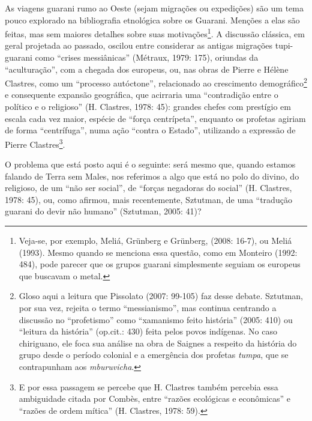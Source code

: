 As viagens guarani rumo ao Oeste (sejam migrações ou expedições) são um
tema pouco explorado na bibliografia etnológica sobre os Guarani.
Menções a elas são feitas, mas sem maiores detalhes sobre suas
motivações\footnote{Veja-se, por exemplo, Meliá, Grünberg e Grünberg,
  (2008: 16-7), ou Meliá (1993). Mesmo quando se menciona essa questão,
  como em Monteiro (1992: 484), pode parecer que os grupos guarani
  simplesmente seguiam os europeus que buscavam o metal.}. A discussão
clássica, em geral projetada ao passado, oscilou entre considerar as
antigas migrações tupi-guarani como ``crises messiânicas'' (Métraux,
1979: 175), oriundas da ``aculturação'', com a chegada dos europeus, ou,
nas obras de Pierre e Hélène Clastres, como um ``processo autóctone'',
relacionado ao crescimento demográfico\footnote{Gloso aqui a leitura que
  Pissolato (2007: 99-105) faz desse debate. Sztutman, por sua vez,
  rejeita o termo ``messianismo'', mas continua centrando a discussão no
  ``profetismo'' como ``xamanismo feito história'' (2005: 410) ou
  ``leitura da história'' (op.cit.: 430) feita pelos povos indígenas. No
  caso chiriguano, ele foca sua análise na obra de Saignes a respeito da
  história do grupo desde o período colonial e a emergência dos profetas
  \emph{tumpa}, que se contrapunham aos \emph{mburuvicha}.} e
consequente expansão geográfica, que acirraria uma ``contradição entre o
político e o religioso'' (H. Clastres, 1978: 45): grandes chefes com
prestígio em escala cada vez maior, espécie de ``força centrípeta'',
enquanto os profetas agiriam de forma ``centrífuga'', numa ação ``contra
o Estado'', utilizando a expressão de Pierre Clastres\footnote{E por
  essa passagem se percebe que H. Clastres também percebia essa
  ambiguidade citada por Combès, entre ``razões ecológicas e
  econômicas'' e ``razões de ordem mítica'' (H. Clastres, 1978: 59).}.

O problema que está posto aqui é o seguinte: será mesmo que, quando
estamos falando de Terra sem Males, nos referimos a algo que está no
polo do divino, do religioso, de um ``não ser social'', de ``forças
negadoras do social'' (H. Clastres, 1978: 45), ou, como afirmou, mais
recentemente, Sztutman, de uma ``tradução guarani do devir não humano''
(Sztutman, 2005: 41)?

